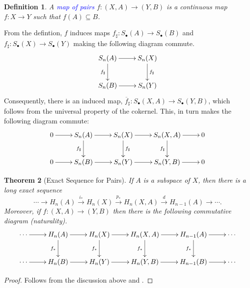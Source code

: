 \documentclass[10pt]{article}
\theoremstyle{thmstyle}
\newtheorem{theorem}{Theorem}[section]
\theoremstyle{defstyle}
\newtheorem{definition}[theorem]{Definition}
\newcommand{\define}[1]{\textcolor{blue}{\textit{#1}}}
\begin{document}
\begin{definition}
    A \define{map of pairs} $f: (X, A)\to (Y, B)$ is a continuous map $f: X\to Y$ such that $f(A)\subseteq B$.
\end{definition}

From the defintion, $f$ induces maps $f_\sharp: S_\bullet(A)\to S_\bullet(B)$ and $f_\sharp: S_\bullet(X)\to S_\bullet(Y)$ making the following diagram commute. 
\begin{equation*}
    \xymatrix {
        S_n(A)\ar[r]\ar[d]_{f_\sharp} & S_n(X)\ar[d]^{f_\sharp}\\
        S_n(B)\ar[r] & S_n(Y)
    }
\end{equation*}
Consequently, there is an induced map, $\overline f_\sharp: S_\bullet(X, A)\to S_\bullet(Y, B)$, which follows from the universal property of the cokernel. This, in turn makes the following diagram commute: 
\begin{equation*}
    \xymatrix {
        0\ar[r] & S_n(A)\ar[r]\ar[d]_{f_\sharp} & S_n(X)\ar[d]^{f_\sharp}\ar[r] & S_n(X, A)\ar[r]\ar[d]_{f_\sharp} & 0\\
        0\ar[r] & S_n(B)\ar[r] & S_n(Y)\ar[r] & S_n(Y, B)\ar[r] & 0
    }
\end{equation*}

\begin{theorem}[Exact Sequence for Pairs]
    If $A$ is a subspace of $X$, then there is a long exact sequence 
    \begin{equation*}
        \cdots\to H_n(A)\stackrel{i_\ast}{\to} H_n(X)\stackrel{p_\ast}{\to} H_n(X, A)\stackrel{d}{\to} H_{n - 1}(A)\to\cdots.
    \end{equation*}
    Moreover, if $f: (X, A)\to (Y, B)$ then there is the following commutative diagram (naturality).
    \begin{equation*}
        \xymatrix {
        \cdots\ar[r] & H_n(A)\ar[r]\ar[d]_{f_\ast} & H_n(X)\ar[r]\ar[d]_{f_\ast} & H_n(X, A)\ar[r]\ar[d]_{f_\ast} & H_{n - 1}(A)\ar[r]\ar[d]_{f_\ast} & \cdots\\
        \cdots\ar[r] & H_n(B)\ar[r] & H_n(Y)\ar[r] & H_n(Y, B)\ar[r] & H_{n - 1}(B)\ar[r] & \cdots
        }
    \end{equation*}
\end{theorem}
\begin{proof}
    Follows from the discussion above and .
\end{proof}
\end{document}
